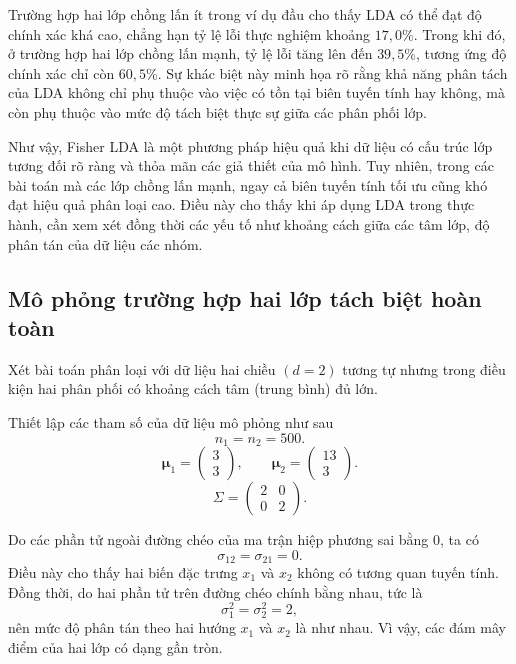 \hspace*{0.5cm}Trường hợp hai lớp chồng lấn ít trong ví dụ đầu cho thấy LDA có thể đạt độ chính xác khá cao, chẳng hạn tỷ lệ lỗi thực nghiệm khoảng $17{,}0\%$. Trong khi đó, ở trường hợp hai lớp chồng lấn mạnh, tỷ lệ lỗi tăng lên đến $39{,}5\%$, tương ứng độ chính xác chỉ còn $60{,}5\%$. Sự khác biệt này minh họa rõ rằng khả năng phân tách của LDA không chỉ phụ thuộc vào việc có tồn tại biên tuyến tính hay không, mà còn phụ thuộc vào mức độ tách biệt thực sự giữa các phân phối lớp.

\hspace*{0.5cm}Như vậy, Fisher LDA là một phương pháp hiệu quả khi dữ liệu có cấu trúc lớp tương đối rõ ràng và thỏa mãn các giả thiết của mô hình. Tuy nhiên, trong các bài toán mà các lớp chồng lấn mạnh, ngay cả biên tuyến tính tối ưu cũng khó đạt hiệu quả phân loại cao. Điều này cho thấy khi áp dụng LDA trong thực hành, cần xem xét đồng thời các yếu tố như khoảng cách giữa các tâm lớp, độ phân tán của dữ liệu các nhóm.


\subsection{Mô phỏng trường hợp hai lớp tách biệt hoàn toàn}

Xét bài toán phân loại với dữ liệu hai chiều $(d=2)$ tương tự nhưng trong điều kiện hai phân phối có khoảng cách tâm (trung bình) đủ lớn.

Thiết lập các tham số của dữ liệu mô phỏng như sau
\[
n_1=n_2=500.
\]
\[
\bm{\mu}_1=
\begin{pmatrix}
	3\\
	3
\end{pmatrix},
\qquad
\bm{\mu}_2=
\begin{pmatrix}
	13\\
	3
\end{pmatrix}.
\]
\[
\Sigma
=
\begin{pmatrix}
	2 & 0\\
	0 & 2
\end{pmatrix}.
\]

Do các phần tử ngoài đường chéo của ma trận hiệp phương sai bằng $0$, ta có
\[
\sigma_{12}=\sigma_{21}=0.
\]
Điều này cho thấy hai biến đặc trưng $x_1$ và $x_2$ không có tương quan tuyến tính. Đồng thời, do hai phần tử trên đường chéo chính bằng nhau, tức là
\[
\sigma_1^2=\sigma_2^2=2,
\]
nên mức độ phân tán theo hai hướng $x_1$ và $x_2$ là như nhau. Vì vậy, các đám mây điểm của hai lớp có dạng gần tròn.

